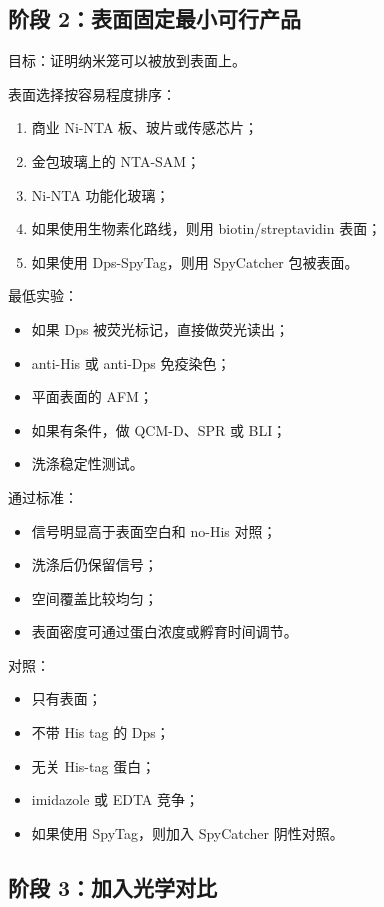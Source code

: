 \documentclass[11pt]{ctexart}
\begin{document}
\subsection{阶段 2：表面固定最小可行产品}

目标：证明纳米笼可以被放到表面上。

表面选择按容易程度排序：

\begin{enumerate}
\item 商业 Ni-NTA 板、玻片或传感芯片；
\item 金包玻璃上的 NTA-SAM；
\item Ni-NTA 功能化玻璃；
\item 如果使用生物素化路线，则用 biotin/streptavidin 表面；
\item 如果使用 Dps-SpyTag，则用 SpyCatcher 包被表面。
\end{enumerate}

最低实验：

\begin{itemize}
\item 如果 Dps 被荧光标记，直接做荧光读出；
\item anti-His 或 anti-Dps 免疫染色；
\item 平面表面的 AFM；
\item 如果有条件，做 QCM-D、SPR 或 BLI；
\item 洗涤稳定性测试。
\end{itemize}

通过标准：

\begin{itemize}
\item 信号明显高于表面空白和 no-His 对照；
\item 洗涤后仍保留信号；
\item 空间覆盖比较均匀；
\item 表面密度可通过蛋白浓度或孵育时间调节。
\end{itemize}

对照：

\begin{itemize}
\item 只有表面；
\item 不带 His tag 的 Dps；
\item 无关 His-tag 蛋白；
\item imidazole 或 EDTA 竞争；
\item 如果使用 SpyTag，则加入 SpyCatcher 阴性对照。
\end{itemize}

\subsection{阶段 3：加入光学对比}
\end{document}
